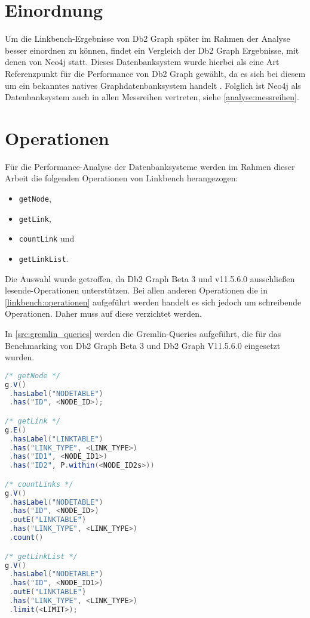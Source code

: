 \section{Einordnung}
\label{analyse:einordnung}
Um die Linkbench-Ergebnisse von Db2 Graph später im Rahmen der Analyse besser einordnen zu können, findet ein Vergleich der Db2 Graph Ergebnisse, mit denen von Neo4j statt. Dieses Datenbanksystem wurde hierbei als eine Art Referenzpunkt für die Performance von Db2 Graph gewählt, da es sich bei diesem um ein bekanntes natives Graphdatenbanksystem handelt \cite{gdbms}. Folglich ist Neo4j als Datenbanksystem auch in allen Messreihen vertreten, siehe \autoref{analyse:messreihen}.

\section{Operationen}
\label{analyse:operationen}
Für die Performance-Analyse der Datenbanksysteme werden im Rahmen dieser Arbeit die folgenden Operationen von Linkbench herangezogen:
\begin{itemize}
    \item \texttt{getNode},
    \item \texttt{getLink},
    \item \texttt{countLink} und
    \item \texttt{getLinkList}.
\end{itemize}
Die Auswahl wurde getroffen, da Db2 Graph Beta 3 und v11.5.6.0 ausschließen lesende-Operationen unterstützen. Bei allen anderen Operationen die in \autoref{linkbench:operationen} aufgeführt werden handelt es sich jedoch um schreibende Operationen. Daher muss auf diese verzichtet werden. 

In \autoref{src:gremlin_queries} werden die Gremlin-Queries aufgeführt, die für das Benchmarking von Db2 Graph Beta 3 und Db2 Graph V11.5.6.0 eingesetzt wurden. 
\begin{lstlisting}[label=src:gremlin_queries,caption={ Gremlin Queries (regulär)},language=Java]
/* getNode */
g.V()
 .hasLabel("NODETABLE")
 .has("ID", <NODE_ID>);

/* getLink */
g.E()
 .hasLabel("LINKTABLE")
 .has("LINK_TYPE", <LINK_TYPE>)
 .has("ID1", <NODE_ID1>)
 .has("ID2", P.within(<NODE_ID2s>))

/* countLinks */
g.V()
 .hasLabel("NODETABLE")
 .has("ID", <NODE_ID>)
 .outE("LINKTABLE")
 .has("LINK_TYPE", <LINK_TYPE>)
 .count()

/* getLinkList */
g.V()
 .hasLabel("NODETABLE")
 .has("ID", <NODE_ID1>)
 .outE("LINKTABLE")
 .has("LINK_TYPE", <LINK_TYPE>)
 .limit(<LIMIT>);
\end{lstlisting}

